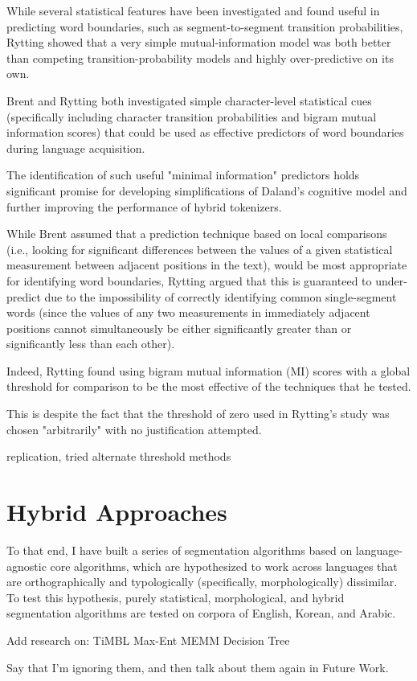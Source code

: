 While several statistical features have been investigated and found useful in predicting word boundaries, such as segment-to-segment transition probabilities\cite{brent96}, Rytting \cite{rytting04} showed that a very simple mutual-information model was both better than competing transition-probability models and highly over-predictive on its own.

Brent\cite{brent99} and Rytting\cite{rytting04} both investigated simple character-level statistical cues (specifically including character transition probabilities and bigram mutual information scores) that could be used as effective predictors of word boundaries during language acquisition.

The identification of such useful "minimal information" predictors holds significant promise for developing simplifications of Daland's cognitive model\cite{daland09} and further improving the performance of hybrid tokenizers.

While Brent\cite{brent99} assumed that a prediction technique based on local comparisons (i.e., looking for significant differences between the values of a given statistical measurement between adjacent positions in the text), would be most appropriate for identifying word boundaries, Rytting\cite{rytting04} argued that this is guaranteed to under-predict due to the impossibility of correctly identifying common single-segment words (since the values of any two measurements in immediately adjacent positions cannot simultaneously be either significantly greater than or significantly less than each other).

Indeed, Rytting\cite{rytting04} found using bigram mutual information (MI) scores with a global threshold for comparison to be the most effective of the techniques that he tested.

This is despite the fact that the threshold of zero used in Rytting's study\cite{rytting04} was chosen "arbitrarily" with no justification attempted.

replication, tried alternate threshold methods \cite{kearsley14}

\section{Hybrid Approaches}

To that end, I have built a series of segmentation algorithms based on language-agnostic core algorithms, which are hypothesized to work across languages that are orthographically and typologically (specifically, morphologically) dissimilar. To test this hypothesis, purely statistical, morphological, and hybrid segmentation algorithms are tested on corpora of English, Korean, and Arabic.

Add research on:
TiMBL
Max-Ent
MEMM
Decision Tree

Say that I'm ignoring them, and then talk about them again in Future Work.